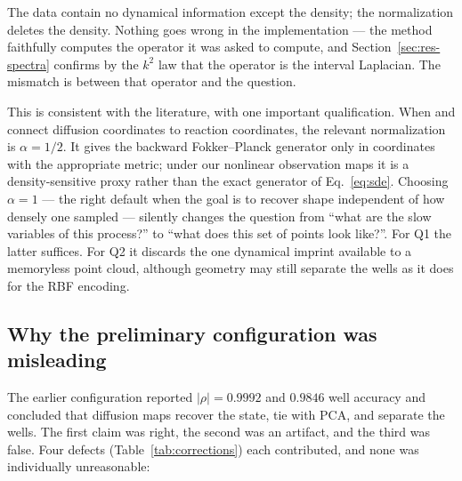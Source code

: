 \documentclass[11pt]{article}
\begin{document}
The data contain no dynamical information except the density; the normalization
deletes the density. Nothing goes wrong in the implementation --- the method
faithfully computes the operator it was asked to compute, and
Section~\ref{sec:res-spectra} confirms by the $k^2$ law that the operator is the
interval Laplacian. The mismatch is between that operator and the question.

This is consistent with the literature, with one important qualification. When
\citet{nadler2006diffusion} and \citet{coifman2008diffusion} connect diffusion
coordinates to reaction coordinates, the relevant normalization is $\alpha=1/2$.
It gives the backward Fokker--Planck generator only in coordinates with the
appropriate metric; under our nonlinear observation maps it is a
density-sensitive proxy rather than the exact generator of Eq.~\eqref{eq:sde}.
Choosing $\alpha=1$ --- the right default when the goal is to recover shape
independent of how densely one sampled --- silently changes the question from
``what are the slow variables of this process?'' to ``what does this set of
points look like?''. For Q1 the latter suffices. For Q2 it discards the one
dynamical imprint available to a memoryless point cloud, although geometry may
still separate the wells as it does for the RBF encoding.

\subsection{Why the preliminary configuration was misleading}
\label{sec:disc-pilot}

The earlier configuration reported $\lvert\rho\rvert = 0.9992$ and $0.9846$ well
accuracy and concluded that diffusion maps recover the state, tie with PCA, and
separate the wells. The first claim was right, the second was an artifact, and
the third was false. Four defects (Table~\ref{tab:corrections}) each contributed,
and none was individually unreasonable:
\end{document}
